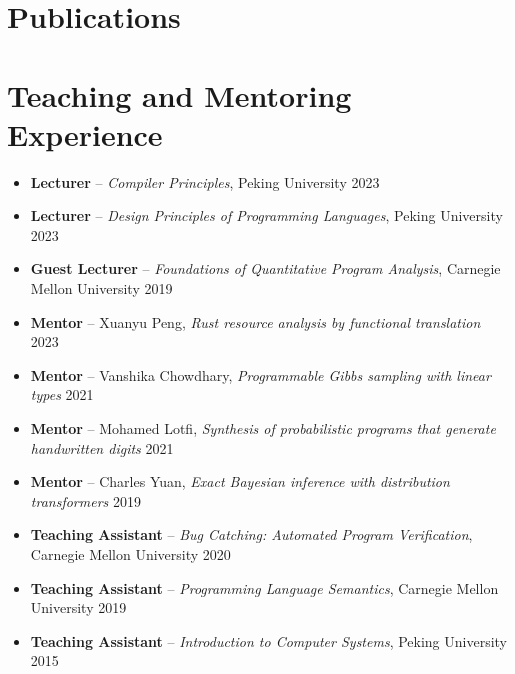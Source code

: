 \documentclass[11pt,letterpaper,roman]{moderncv}        %
\begin{document}
\section{Publications}
\vspace{4pt}

\section{Teaching and Mentoring Experience}

\begin{itemize}
  \item \textbf{Lecturer} -- \emph{Compiler Principles}, Peking University \hfill 2023
  \item \textbf{Lecturer} -- \emph{Design Principles of Programming Languages}, Peking University \hfill 2023
  \item \textbf{Guest Lecturer} -- \emph{Foundations of Quantitative Program Analysis}, Carnegie Mellon University \hfill 2019

  \vspace{4pt}

  \item \textbf{Mentor} -- Xuanyu Peng, \emph{Rust resource analysis by functional translation} \hfill 2023
  \item \textbf{Mentor} -- Vanshika Chowdhary, \emph{Programmable Gibbs sampling with linear types} \hfill 2021
  \item \textbf{Mentor} -- Mohamed Lotfi, \emph{Synthesis of probabilistic programs that generate handwritten digits} \hfill 2021
  \item \textbf{Mentor} -- Charles Yuan, \emph{Exact Bayesian inference with distribution transformers} \hfill 2019

  \vspace{4pt}

  \item \textbf{Teaching Assistant} -- \emph{Bug Catching: Automated Program Verification}, Carnegie Mellon University \hfill 2020
  \item \textbf{Teaching Assistant} -- \emph{Programming Language Semantics}, Carnegie Mellon University \hfill 2019
  \item \textbf{Teaching Assistant} -- \emph{Introduction to Computer Systems}, Peking University \hfill 2015
\end{itemize}
\end{document}
